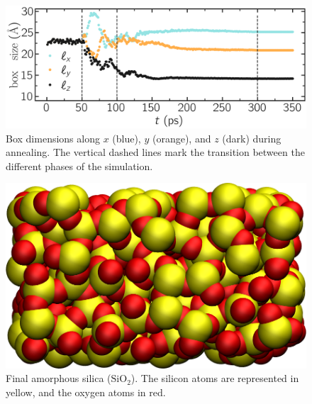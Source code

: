 \documentclass[9pt,tutorial]{livecoms}
\begin{document}
\begin{figure}
\centering
\includegraphics[width=\linewidth]{GCMC-dimension}
\caption{Box dimensions along $x$ (blue), $y$ (orange), and $z$ (dark) during annealing. The vertical dashed lines mark the transition between the different phases of the simulation.}
\label{fig:GCMC-dimension}
\end{figure}

\begin{figure}
\centering
\includegraphics[width=0.9\linewidth]{GCMC-snapshot}
\caption{Final amorphous silica ($\text{SiO}_2$). The silicon atoms are represented in yellow, and the oxygen atoms in red.}
\label{fig:GCMC-snapshot}
\end{figure}
\end{document}
